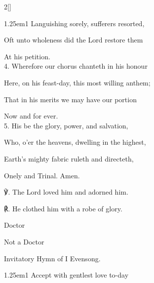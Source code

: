 \begin{paracol}{2}[]
\begin{hangparas}{1.25em}{1}
Languishing sorely, sufferers resorted,

Oft unto wholeness did the Lord restore them

At his petition.\\

4. Wherefore our chorus chanteth in his honour

Here, on his feast-day, this most willing anthem;

That in his merits we may have our portion

Now and for ever.\\

5. His be the glory, power, and salvation,

Who, o'er the heavens, dwelling in the highest,

Earth's mighty fabric ruleth and directeth,

Onely and Trinal. Amen.\\
\end{hangparas}

℣. The Lord loved him and adorned him.

℟. He clothed him with a robe of glory.

\begin{inhead}
	Doctor
\end{inhead}
\begin{inhead}
	Not a Doctor
\end{inhead}

\switchcolumn

\mattins


\begin{rubric}
	Invitatory Hymn of I Evensong.
\end{rubric}

\mattinsOfficeHymn\label{ConfessorBishopMattins}



\begin{hangparas}{1.25em}{1}
Accept with gentlest love to-day


\end{hangparas}
\end{paracol}
